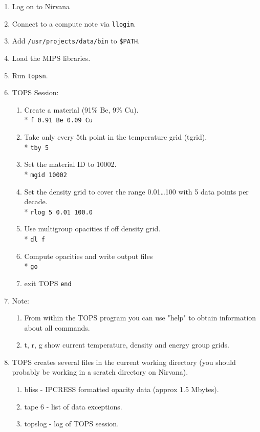 \documentclass[11pt]{nmemo}
\begin{document}
\flushleft
\begin{enumerate}
\item Log on to Nirvana
\item Connect to a compute note via \texttt{llogin}.
\item Add \texttt{/usr/projects/data/bin} to \texttt{\$PATH}.
\item Load the MIPS libraries.
\item Run \texttt{topsn}.
\item TOPS Session:
  \begin{enumerate}
    \item Create a material (91\% Be, 9\% Cu). \\*
      \texttt{f 0.91 Be 0.09 Cu}
    \item Take only every 5th point in the temperature grid
      (tgrid). \\*
      \texttt{tby 5}
    \item Set the material ID to 10002. \\*
      \texttt{mgid 10002}
    \item Set the density grid to cover the range 0.01\ldots100 with 
      5 data points per decade. \\*
      \texttt{rlog 5 0.01 100.0}
    \item Use multigroup opacities if off density grid. \\*
      \texttt{dl f}
    \item Compute opacities and write output files \\*
      \texttt{go}
    \item exit TOPS
      \texttt{end}      
  \end{enumerate}
\item Note:
  \begin{enumerate}
  \item From within the TOPS program you can use "help" to obtain
    information about all commands. 
  \item t, r, g show current temperature, density and energy group
    grids. 
  \end{enumerate}
\item TOPS creates several files in the current working
  directory (you should probably be working in a scratch directory on
  Nirvana). 
  \begin{enumerate}
  \item bliss - IPCRESS formatted opacity data (approx 1.5 Mbytes).
  \item tape 6 - list of data exceptions.
  \item topslog - log of TOPS session.
  \end{enumerate}
\end{enumerate}
\end{document}
